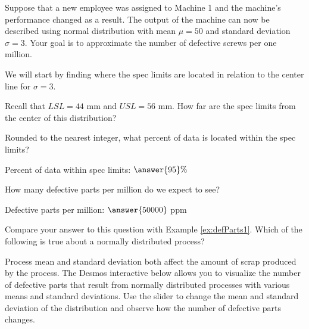 \documentclass{ximera}
\begin{document}
\begin{question}\label{quest:defParts1}
    Suppose that a new employee was assigned to Machine 1 and the machine's performance changed as a result.   The output of the machine can now be described using normal distribution with mean $\mu=50$ and standard deviation $\sigma=3$.  Your goal is to approximate the number of defective screws per one million.

    We will start by finding where the spec limits are located in relation to the center line for $\sigma=3$.  
    
    Recall that $LSL=44$ mm and $USL=56$ mm. How far are the spec limits from the center of this distribution?

    \begin{multipleChoice}
    \end{multipleChoice}

Rounded to the nearest integer, what percent of data is located within the spec limits?

Percent of data within spec limits: $\answer{95}\%$

How many defective parts per million do we expect to see?  

Defective parts per million: $\answer{50000}$ ppm

Compare your answer to this question with Example \ref{ex:defParts1}.  Which of the following is true about a normally distributed process?

\begin{multipleChoice}
\end{multipleChoice}
    
\end{question}

Process mean and standard deviation both affect the amount of scrap produced by the process.  The Desmos interactive below allows you to visualize the number of defective parts that result from normally distributed processes with various means and standard deviations.  Use the slider to change the mean and standard deviation of the distribution and observe how the number of defective parts changes.
\end{document}
